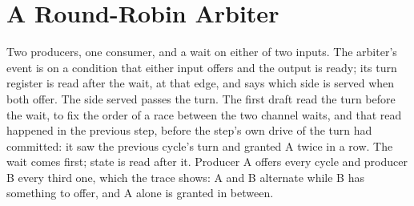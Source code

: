 \section{A Round-Robin Arbiter}
\label{sec:x-arbiter}

Two producers, one consumer, and a wait on either of two inputs. The
arbiter's event is  on a condition that either input
offers and the output is ready; its turn register is read after the
wait, at that edge, and says which side is served when both offer.
The side served passes the turn. The first draft read the turn before
the wait, to fix the order of a race between the two channel waits,
and that read happened in the previous step, before the step's own
drive of the turn had committed: it saw the previous cycle's turn and
granted A twice in a row. The wait comes first; state is read after
it. Producer A offers every cycle and producer B every third one,
which the trace shows: A and B alternate while B has something to
offer, and A alone is granted in between.




